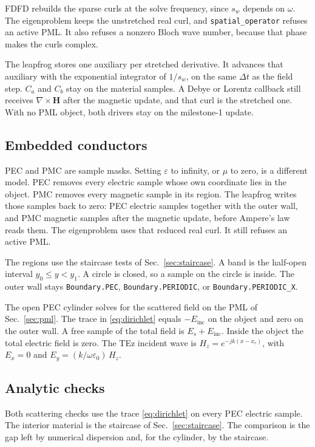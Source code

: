 \documentclass[11pt,a4paper]{article}
\begin{document}
FDFD rebuilds the sparse curls at the solve frequency, since $s_w$ depends
on $\omega$. The eigenproblem keeps the unstretched real curl, and
\texttt{spatial\_operator} refuses an active PML. It also refuses a
nonzero Bloch wave number, because that phase makes the curls complex.

The leapfrog stores one auxiliary per stretched derivative. It advances
that auxiliary with the exponential integrator of $1/s_w$, on the same
$\Delta t$ as the field step. $C_a$ and $C_b$ stay on the material
samples. A Debye or Lorentz callback still receives
$\nabla\times\mathbf{H}$ after the magnetic update, and that curl is the
stretched one. With no PML object, both drivers stay on the milestone-1
update.

\subsection{Embedded conductors}
\label{sec:conductors}

PEC and PMC are sample masks. Setting $\varepsilon$ to infinity, or $\mu$
to zero, is a different model. PEC removes every electric sample whose own
coordinate lies in the object. PMC removes every magnetic sample in its
region. The leapfrog writes those samples back to zero: PEC electric
samples together with the outer wall, and PMC magnetic samples after the
magnetic update, before Ampere's law reads them. The eigenproblem uses
that reduced real curl. It still refuses an active PML.

The regions use the staircase tests of Sec.~\ref{sec:staircase}. A band is
the half-open interval $y_0\le y<y_1$. A circle is closed, so a sample on
the circle is inside. The outer wall stays \texttt{Boundary.PEC},
\texttt{Boundary.PERIODIC}, or \texttt{Boundary.PERIODIC\_X}.

The open PEC cylinder solves for the scattered field on the PML of
Sec.~\ref{sec:pml}. The trace in \eqref{eq:dirichlet} equals
$-E_{\mathrm{inc}}$ on the object and zero on the outer wall. A free
sample of the total field is $E_s+E_{\mathrm{inc}}$. Inside the object the
total electric field is zero. The TEz incident wave is
$H_z=e^{-jk(x-x_c)}$, with $E_x=0$ and
$E_y=(k/\omega\varepsilon_0)\,H_z$.

\subsection{Analytic checks}
\label{sec:analytics}

Both scattering checks use the trace \eqref{eq:dirichlet} on every PEC
electric sample. The interior material is the staircase of
Sec.~\ref{sec:staircase}. The comparison is the gap left by numerical
dispersion and, for the cylinder, by the staircase.
\end{document}
